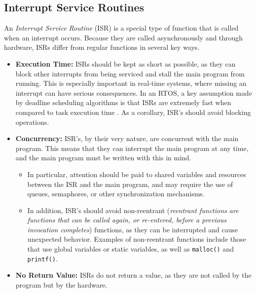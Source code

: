 \documentclass[main.tex]{subfiles}
\begin{document}
\subsection{Interrupt Service Routines}
An \textit{Interrupt Service Routine} (ISR) is a special type of function that is called when an interrupt occurs. Because they are called asynchronously and through hardware, ISRs differ from regular functions in several key ways.
\begin{itemize}
    \item \textbf{Execution Time:} ISRs should be kept as short as possible, as they can block other interrupts from being serviced and stall the main program from running. This is especially important in real-time systems, where missing an interrupt can have serious consequences. In an RTOS, a key assumption made by deadline scheduling algorithms is that ISRs are extremely fast when compared to task execution time \cite{BetterEmbeddedSystemSoftware}. As a corollary, ISR's should avoid blocking operations.
    \item \textbf{Concurrency:} ISR's, by their very nature, are concurrent with the main program. This means that they can interrupt the main program at any time, and the main program must be written with this in mind. 
    \begin{itemize} 
        \item In particular, attention should be paid to shared variables and resources between the ISR and the main program, and may require the use of queues, semaphores, or other synchronization mechanisms.
        \item In addition, ISR's should avoid non-reentrant (\textit{reentrant functions are functions that can be called again, or re-entered, before a previous invocation completes}) functions, as they can be interrupted and cause unexpected behavior. Examples of non-reentrant functions include those that use global variables or static variables, as well as \texttt{malloc()} and \texttt{printf()}.
    \end{itemize}
    \item \textbf{No Return Value:} ISRs do not return a value, as they are not called by the program but by the hardware.
\end{itemize}
\end{document}
